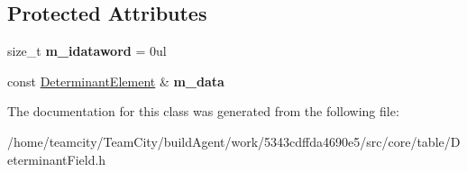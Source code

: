 \subsection*{Protected Attributes}
\begin{DoxyCompactItemize}
\item 
size\+\_\+t {\bfseries m\+\_\+idataword} = 0ul\hypertarget{classDeterminantElement_1_1DatawordEnumerator_a1b22f498dcfa87d06d556559879e6b50}{}\label{classDeterminantElement_1_1DatawordEnumerator_a1b22f498dcfa87d06d556559879e6b50}

\item 
const \hyperlink{classDeterminantElement}{Determinant\+Element} \& {\bfseries m\+\_\+data}\hypertarget{classDeterminantElement_1_1DatawordEnumerator_ab4dcfbb2b8b76ccdb76389e39139120d}{}\label{classDeterminantElement_1_1DatawordEnumerator_ab4dcfbb2b8b76ccdb76389e39139120d}

\end{DoxyCompactItemize}


The documentation for this class was generated from the following file\+:\begin{DoxyCompactItemize}
\item 
/home/teamcity/\+Team\+City/build\+Agent/work/5343cdffda4690e5/src/core/table/Determinant\+Field.\+h\end{DoxyCompactItemize}
